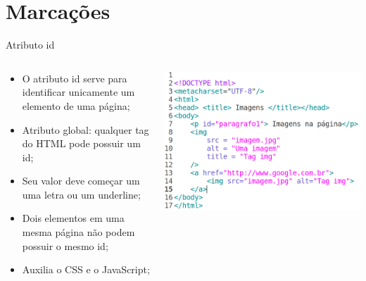 \documentclass{beamer}
\begin{document}
\section{Marcações}
\begin{frame}{Atributo id}
  \begin{columns}
    \begin{column}{0.45 \textwidth}
      \small
     \begin{itemize}
      \item O atributo id serve para identificar unicamente um
elemento de uma página;
       \item Atributo global: qualquer tag do HTML pode possuir um id;
       \item Seu valor deve começar um uma letra ou um underline;
       \item Dois elementos em uma mesma página não podem possuir o mesmo 
id;
       \item Auxilia o CSS e o JavaScript;
     \end{itemize}
    \end{column}
    
    \begin{column}{0.5\textwidth}
     \includegraphics[height=0.45\paperheight]{fig/aula1/html10.png}
    \end{column}
  \end{columns}
\end{frame}
\end{document}
